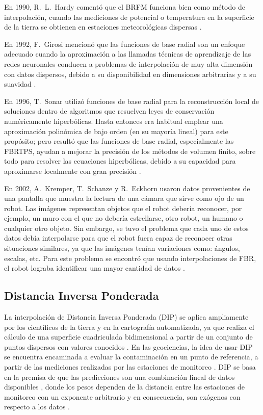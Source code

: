 En 1990, R.\ L.\ Hardy comentó que el BRFM funciona bien como método de interpolación, cuando las mediciones de potencial o temperatura en la superficie de la tierra se obtienen en estaciones meteorológicas dispersas \citep{hardy1990}.

En 1992, F.\ Girosi mencionó que las funciones de base radial son un enfoque adecuado cuando la aproximación a las llamadas técnicas de aprendizaje de las redes neuronales conducen a problemas de interpolación de muy alta dimensión con datos dispersos, debido a su disponibilidad en dimensiones arbitrarias y a su suavidad \citep{girosi}.

En 1996, T.\ Sonar utilizó funciones de base radial para la reconstrucción local de soluciones dentro de algoritmos que resuelven leyes de conservación numéricamente hiperbólicas. Hasta entonces era habitual emplear una aproximación polinómica de bajo orden (en su mayoría lineal) para este propósito; pero resultó que las funciones de base radial, especialmente las FBRTPS, ayudan a mejorar la precisión de los métodos de volumen finito, sobre todo para resolver las ecuaciones hiperbólicas, debido a su capacidad para aproximarse localmente con gran precisión \citep{sonar}.

En 2002, A.\ Kremper, T.\ Schanze y R.\ Eckhorn usaron datos provenientes de una pantalla que muestra la lectura de una cámara que sirve como ojo de un robot. Las imágenes representan objetos que el robot debería reconocer, por ejemplo, un muro con el que no debería estrellarse, otro robot, un humano o cualquier otro objeto. Sin embargo, se tuvo el problema que cada uno de estos datos debía interpolarse para que el robot fuera capaz de reconocer otras situaciones similares, ya que las imágenes tenían variaciones como: ángulos, escalas, etc. Para este problema se encontró que usando interpolaciones de FBR, el robot lograba identificar una mayor cantidad de datos \citep{kremper}.




\subsection{Distancia Inversa Ponderada}

La interpolación de Distancia Inversa Ponderada (DIP) se aplica ampliamente por los científicos de la tierra \citep{ware} y en la cartografía automatizada, ya que realiza el cálculo de una superficie cuadriculada bidimensional a partir de un conjunto de puntos dispersos con valores conocidos \citep{armstrong}. En las geociencias, la idea de usar DIP se encuentra encaminada a evaluar la contaminación en un punto de referencia, a partir de las mediciones realizadas por las estaciones de monitoreo \citep{vogl}. DIP se basa en la premisa de que las predicciones son una combinación lineal de datos disponibles \citep{xie}, donde los pesos dependen de la distancia entre las estaciones de monitoreo con un exponente arbitrario y en consecuencia, son exógenos con respecto a los datos \citep{armstrong}.

